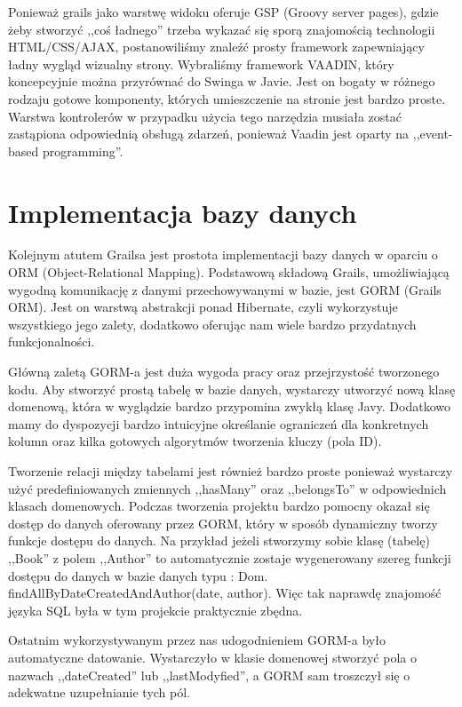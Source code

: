 \indent Ponieważ grails jako warstwę widoku oferuje GSP (Groovy server pages), gdzie żeby stworzyć ,,coś ładnego'' trzeba wykazać się sporą znajomością technologii HTML/CSS/AJAX, postanowiliśmy znaleźć prosty framework zapewniający ładny wygląd wizualny strony. Wybraliśmy framework VAADIN, który koncepcyjnie można przyrównać do Swinga w Javie. Jest on bogaty w różnego rodzaju gotowe komponenty, których umieszczenie na stronie jest bardzo proste. Warstwa kontrolerów w przypadku użycia tego narzędzia musiała zostać zastąpiona odpowiednią obsługą zdarzeń, ponieważ Vaadin jest oparty na ,,event-based programming''. 



\section{Implementacja bazy danych}
\label{sec:impldb}

Kolejnym atutem Grailsa jest prostota implementacji bazy danych w oparciu o ORM (Object-Relational Mapping). Podstawową składową Grails, umożliwiającą wygodną komunikację z danymi przechowywanymi w bazie, jest GORM (Grails ORM). Jest on warstwą abstrakcji ponad Hibernate, czyli wykorzystuje wszystkiego jego zalety, dodatkowo oferując nam wiele bardzo przydatnych funkcjonalności. 

Główną zaletą GORM-a jest duża wygoda pracy oraz przejrzystość tworzonego kodu. Aby stworzyć prostą tabelę w bazie danych, wystarczy utworzyć nową klasę domenową, która w wyglądzie bardzo przypomina zwykłą klasę Javy. Dodatkowo mamy do dyspozycji bardzo intuicyjne określanie ograniczeń dla konkretnych kolumn oraz kilka gotowych algorytmów tworzenia kluczy (pola ID). 

Tworzenie relacji między tabelami jest również bardzo proste ponieważ wystarczy użyć predefiniowanych zmiennych ,,hasMany'' oraz ,,belongsTo'' w odpowiednich klasach domenowych. Podczas tworzenia projektu bardzo pomocny okazał się dostęp do danych oferowany przez GORM, który w sposób dynamiczny tworzy funkcje dostępu do danych. Na przykład jeżeli stworzymy sobie klasę (tabelę) ,,Book'' z polem ,,Author'' to automatycznie zostaje wygenerowany szereg funkcji dostępu do danych w bazie danych typu : Dom. findAllByDateCreatedAndAuthor(date, author). Więc tak naprawdę znajomość języka SQL była w tym projekcie praktycznie zbędna.

Ostatnim wykorzystywanym przez nas udogodnieniem GORM-a było automatyczne datowanie. Wystarczyło w klasie domenowej stworzyć pola o nazwach ,,dateCreated'' lub ,,lastModyfied'', a GORM sam troszczył się o adekwatne uzupełnianie tych pól.

